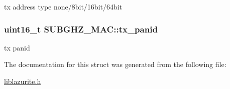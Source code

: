 tx address type none/8bit/16bit/64bit \hypertarget{structSUBGHZ__MAC_a5c8a6b3db84a529da0930cbdbab44511}{
\subsubsection[{tx\+\_\+panid}]{\setlength{\rightskip}{0pt plus 5cm}uint16\+\_\+t S\+U\+B\+G\+H\+Z\+\_\+\+M\+A\+C\+::tx\+\_\+panid}}\label{structSUBGHZ__MAC_a5c8a6b3db84a529da0930cbdbab44511}
tx panid 

The documentation for this struct was generated from the following file\+:\begin{DoxyCompactItemize}
\item 
\hyperlink{liblazurite_8h}{liblazurite.\+h}\end{DoxyCompactItemize}
